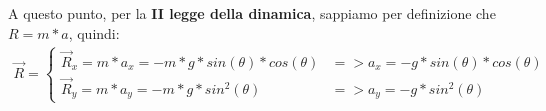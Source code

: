             A questo punto, per la \textbf{II legge della dinamica}, sappiamo per definizione che $R = m*a$, quindi:
            \begin{align*}
                \vec{R}=
                \begin{cases}
                    \vec{R}_x = m*a_x = -m*g*sin(\theta)*cos(\theta) & => a_x = -g*sin(\theta)*cos(\theta)\\
                    \vec{R}_y = m*a_y = -m*g*sin^2(\theta) & => a_y = -g*sin^2(\theta)
                \end{cases}
            \end{align*}
